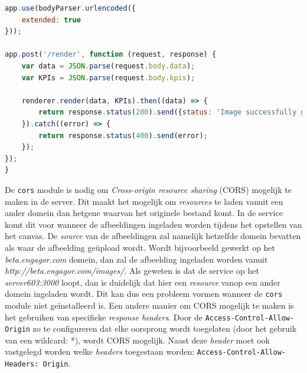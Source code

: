\begin{lstlisting}[caption={index.js - Node.js server},label=lst:ExpressIndexServer,language=javascript]
app.use(bodyParser.urlencoded({
	extended: true
}));

app.post('/render', function (request, response) {
	var data = JSON.parse(request.body.data);
	var KPIs = JSON.parse(request.body.kpis);
	
	renderer.render(data, KPIs).then((data) => {
		return response.status(200).send({status: 'Image successfully generated', image: 	data.toString('base64')});
	}).catch((error) => {
		return response.status(400).send(error);
	});
});
}
\end{lstlisting}

De \texttt{cors} module is nodig om \textit{Cross-origin resource sharing} (CORS) mogelijk te maken in de server. Dit maakt het mogelijk om \textit{resources} te laden vanuit een ander domein dan hetgene waarvan het originele bestand komt. In de service komt dit voor wanneer de afbeeldingen ingeladen worden tijdens het opstellen van het canvas. De \textit{source} van de afbeeldingen zal namelijk hetzelfde domein bevatten als waar de afbeelding ge\"{u}pload wordt. Wordt bijvoorbeeld gewerkt op het \textit{beta.engagor.com} domein, dan zal de afbeelding ingeladen worden vanuit \textit{http://beta.engagor.com/images/}. Als geweten is dat de service op het \textit{server603:3000} loopt, dan is duidelijk dat hier een \textit{resource} vanop een ander domein ingeladen wordt. Dit kan dus een probleem vormen wanneer de \texttt{cors} module niet ge\"{i}nstalleerd is. %
Een andere manier om CORS mogelijk te maken is het gebruiken van specifieke \textit{response headers}. Door de \texttt{Access-Control-Allow-Origin} zo te configureren dat elke oorsprong wordt toegelaten (door het gebruik van een wildcard: *), wordt CORS mogelijk. Naast deze \textit{header} moet ook vastgelegd worden welke \textit{headers} toegestaan worden: \texttt{Access-Control-Allow-Headers: Origin}. %




 




